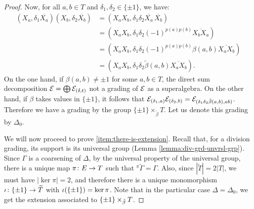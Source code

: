 \begin{proof}
	Now, for all $a, b \in T$ and $\delta_1, \delta_2 \in \{ \pm 1 \}$, we have:
	\begin{align*}
		(X_{a}, \delta_1 \overline{X_{a}})(X_{b}, \delta_2 \overline{X_{b}}) & = (X_{a} X_{b}, \delta_1 \delta_2 \overline{X_{a}} \,\overline{X_{b}})               \\
		                                                                     & = (X_{a} X_{b}, \delta_1 \delta_2 (-1)^{p(a)p(b)} \overline{X_{b}X_{a}})             \\
		                                                                     & =(X_{a} X_{b}, \delta_1 \delta_2 (-1)^{p(a)p(b)} \beta(a, b) \overline{X_{a} X_{b}}) \\
		                                                                     & = (X_{a} X_{b}, \delta_1 \delta_2 \tilde\beta (a,b) \overline{X_{a} X_{b}}).
	\end{align*}
	On the one hand, if $\beta(a, b) \neq \pm 1$ for some $a,b \in T$, the direct sum decomposition $\mathcal E = \bigoplus \mathcal E_{(\delta, t)}$ not a grading of $\mathcal E$ as a superalgebra.
	On the other hand, if $\beta$ takes values in $\{ \pm 1 \}$, it follows that $\mathcal E_{(\delta_1, a)} \mathcal E_{(\delta_2, b)} = \mathcal E_{(\delta_1 \delta_2 \tilde\beta (a,b), ab)}$.
	Therefore we have a grading by the group $\{ \pm 1\} \times_{\tilde\beta} T$.
	Let us denote this grading by $\Delta_0$.

	We will now proceed to prove \eqref{item:there-is-extension}.
	Recall that, for a division grading, its support is its universal group (Lemma \ref{lemma:div-grd-unvrsl-grp}).
	Since $\Gamma$ is a coarsening of $\Delta$, by the universal property of the universal group, there is a unique map $\pi\colon E\to T$ such that ${}^{\pi}\widetilde \Gamma = \Gamma$.
	Also, since $|\widetilde T| = 2 |T|$, we must have $|\ker \pi| = 2$, and therefore there is a unique monomorphism $\iota\colon \{ \pm 1 \} \to \widetilde T$ with $\iota(\{ \pm 1 \}) = \ker \pi$.
	Note that in the particular case $\Delta = \Delta_0$, we get the extension associated to $\{ \pm 1 \} \times_{\tilde\beta} T$.


\end{proof}

